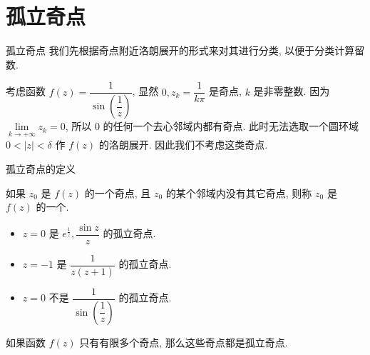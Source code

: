 \section{孤立奇点}


\begin{frame}{孤立奇点}
\onslide<+->
我们先根据奇点附近洛朗展开的形式来对其进行分类, 以便于分类计算留数.
\begin{example}
考虑函数 $f(z)=\dfrac1{\sin\left(\dfrac1z\right)}$, 显然 $0,z_k=\dfrac1{k\pi}$ 是奇点, $k$ 是非零整数.
\onslide<+->
因为 $\lim\limits_{k\to+\infty} z_k=0$, 所以 $0$ 的任何一个去心邻域内都有奇点.
\onslide<+->
此时无法选取一个圆环域 $0<|z|<\delta$ 作 $f(z)$ 的洛朗展开.
\onslide<+->
因此我们不考虑这类奇点.
\vspace{-9pt}
\begin{center}
\end{center}
\vspace{-7pt}
\end{example}
\end{frame}


\begin{frame}{孤立奇点的定义}
\begin{definition}
如果 $z_0$ 是 $f(z)$ 的一个奇点, 且 $z_0$ 的某个邻域内没有其它奇点, 则称 $z_0$ 是 $f(z)$ 的一个.
\end{definition}
\begin{example}
\begin{itemize}
\item $z=0$ 是 $e^{\frac1z},\dfrac{\sin z}z$ 的孤立奇点.
\item $z=-1$ 是 $\dfrac1{z(z+1)}$ 的孤立奇点.
\item $z=0$ 不是 $\dfrac1{\sin\left(\dfrac1z\right)}$ 的孤立奇点.
\end{itemize}
\end{example}
\onslide<+->
如果函数 $f(z)$ 只有有限多个奇点, 那么这些奇点都是孤立奇点.
\end{frame}


